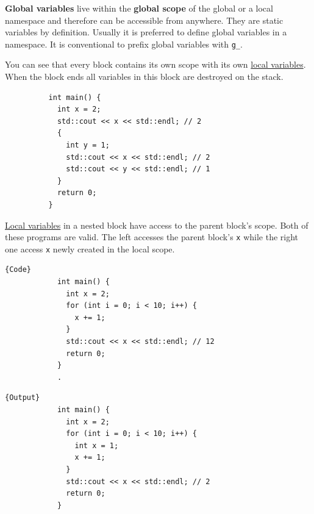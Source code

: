 \documentclass{article}
\newcounter{definition}[section]
\newcounter{example}[section]
\begin{document}
      \begin{definition}
        \label{def:global-variables}
        \textbf{Global variables} live within the \textbf{global scope} of the global or a local namespace and therefore can be accessible from anywhere. They are static variables by definition. Usually it is preferred to define global variables in a namespace. It is conventional to prefix global variables with \texttt{g\_}. 
      \end{definition}

      \begin{example}
        \label{ex:automatic-duration}
        You can see that every block contains its own scope with its own \hyperref[def:local-variables]{local variables}. When the block ends all variables in this block are destroyed on the stack. 

        \begin{lstlisting}
          int main() {  
            int x = 2; 
            std::cout << x << std::endl; // 2
            {
              int y = 1;
              std::cout << x << std::endl; // 2
              std::cout << y << std::endl; // 1
            }
            return 0; 
          }
        \end{lstlisting}
      \end{example}

      \begin{example}
        \label{ex:accessing-parent-block-scope}
        \hyperref[def:local-variables]{Local variables} in a nested block have access to the parent block's scope. Both of these programs are valid. The left accesses the parent block's \texttt{x} while the right one access \texttt{x} newly created in the local scope. 

        \noindent\begin{minipage}{.5\textwidth}
          \begin{lstlisting}[]{Code}
            int main() {  
              int x = 2; 
              for (int i = 0; i < 10; i++) {
                x += 1;
              }
              std::cout << x << std::endl; // 12
              return 0; 
            }
            .
          \end{lstlisting}
          \end{minipage}
          \hfill
          \begin{minipage}{.49\textwidth}
          \begin{lstlisting}[]{Output}
            int main() {  
              int x = 2; 
              for (int i = 0; i < 10; i++) {
                int x = 1;
                x += 1;
              }
              std::cout << x << std::endl; // 2
              return 0; 
            }
          \end{lstlisting}
        \end{minipage}
      \end{example}
\end{document}
